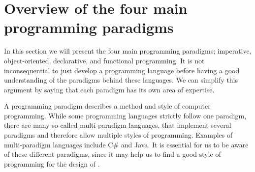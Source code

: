 \section{Overview of the four main programming paradigms}
\label{sec:paradigms}

In this section we will present the four main programming paradigms; imperative,
object-oriented, declarative, and functional programming. It is not
inconsequential to just develop a programming language before having a good
understanding of the paradigms behind these languages. We can simplify this
argument by saying that each paradigm has its own area of expertise.

A programming paradigm describes a method and style of computer programming.
While some programming languages strictly follow one paradigm, there are many
so-called multi-paradigm languages, that implement several paradigms and
therefore allow multiple styles of programming. Examples of multi-paradigm
languages include C\# and Java. It is essential for us to be aware of these
different paradigms, since it may help us to find a good style of programming
for the design of \productname{}.

